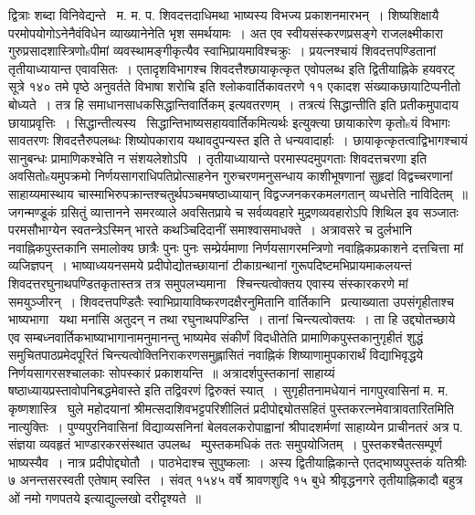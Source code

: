\documentclass[11pt, openany]{book}
\begin{document}
\noindent
द्वित्राः शब्दा विनिवेद्यन्ते \textendash\ म. म. प. शिवदत्तदाधिमथा भाष्यस्य विभज्य प्रकाशनमारभन्~। शिष्यशिक्षायै परमोपयोगोऽनेनैवंविधेन व्याख्यानेनेति भृश समर्थयामः~। अत एव स्वीयसंस्करणप्रसङ्गे राजलक्ष्मीकारा गुरुप्रसादशास्त्रिणोsपीमां व्यवस्थामङ्गीकृत्यैव स्वाभिप्रायमाविश्चक्रुः~। प्रयत्नश्चायं शिवदत्तपण्डितानां तृतीयाध्यायान्त एवावसितः~। एतादृशविभागश्च शिवदत्तैश्छायाकृत्कृत एवोपलब्ध इति द्वितीयाह्निके हयवरट् सूत्रे १४० तमे पृष्ठे {\qt अनुवर्तते विभाषा शरोचि} इति श्लोकवार्तिकावतरणे ११ एकादश संख्याकछायाटिप्पनीतो बोध्यते~। तत्र हि समाधानसाधकसिद्धान्तिवार्तिकम् इत्यवतरणम्~। तत्रत्यं {\qt सिद्धान्तीति} इति प्रतीकमुपादाय छायाप्रवृत्तिः~। {\qt सिद्धान्तीत्यस्य \textendash\ सिद्धान्तिभाष्यसहायवार्तिकमित्यर्थः} इत्युक्त्या छायाकारेण कृतोsयं विभागः सावतरणः शिवदत्तैरुपलब्धः शिष्योपकाराय यथावदुपन्यस्त इति ते धन्यवादार्हाः~। छायाकृत्कृतत्वाद्विभागश्चायं सानुबन्धः प्रामाणिकश्चेति न संशयलेशोऽपि~। तृतीयाध्यायान्ते परमास्पदमुपगताः शिवदत्तचरणा इति अवसितोsयमुपक्रमो निर्णयसागराधिपतिप्रोत्साहनेन गुरुचरणमनुसन्धाय काशीभूषणानां सुहृदां विद्वच्चरणानां साहाय्यमास्थाय चास्माभिरुपक्रान्तश्चतुर्थपञ्चमषष्ठाध्यायान् विद्वज्जनकरकमलगतान् व्यधत्तेति नाविदितम्~॥ जगन्मण्डूकं ग्रसितुं व्यात्तानने समरव्याले अवसितप्राये च सर्वव्यवहारे मुद्रणव्यवहारोऽपि शिथिल इव सञ्जातः परमसौभाग्येन स्वतन्त्रेऽस्मिन् भारते कथञ्चिदिदानीं समाश्वासमाधक्ते~। अत्रावसरे च दुर्लभानि नवाह्निकपुस्तकानि समालोक्य छात्रैः पुनः पुनः सम्प्रेर्यमाणा निर्णयसागरमन्त्रिणो नवाह्निकप्रकाशने दत्तचित्ता मां व्यजिज्ञपन्~। भाष्याध्ययनसमये प्रदीपोद्योतच्छायानां टीकाग्रन्थानां गुरूपदिष्टमभिप्रायमाकलयन्तं शिवदत्तरघुनाथपण्डितकृतास्तत्र तत्र समुपलभ्यमाना \textendash\ श्चिन्त्यत्वोक्तय एवास्य संस्कारकरणे मां समयुञ्जीरन्~। शिवदत्तपण्डितैः स्वाभिप्रायाविष्करणदक्षैरनुमितानि वार्तिकानि \textendash\ प्रत्याख्याता उपसंगृहीताश्च भाष्यभागा \textendash\ यथा मनांसि अतुदन् न तथा रघुनाथपण्डिन्ति~। तानां चिन्त्यत्वोक्तयः~। ता हि उद्द्योतच्छाये एव सम्बध्नवार्तिकभाष्याभागानामनुमानन्तु भाष्यमेव संकीर्णं विदधीतेति प्रामाणिकपुस्तकानुगृहीतं शुद्धं समुचितपाठप्रमेदपूरितं चिन्त्यत्वोक्तिनिराकरणसमुह्लासितं नवाह्निकं शिष्याणामुपकारार्थं विद्याभिवृद्धये निर्णयसागरसश्चालकाः सोपस्कारं प्रकाशयन्ति~॥ अत्रादर्शपुस्तकानां साहाय्यं षष्ठाध्यायप्रस्तावोपनिबद्धमेवास्ते इति तद्विवरणं द्विरुक्तं स्यात्~। सुगृहीतनामधेयानं नागपुरवासिनां म. म. कृष्णशास्त्रि \textendash\ घुले महोदयानां श्रीमत्सदाशिवभट्टपरिशीलितं प्रदीपोद्द्योतसहितं पुस्तकरत्नमेवात्रावतारितमिति नात्युक्तिः~। पुण्यपुरनिवासिनां विद्याव्यसनिनां बेलवलकरोपाह्वानां श्रीपादशर्मणां साहाय्येन प्राचीनतरं अत्र प. संज्ञया व्यवहृतं भाण्डारकरसंस्थात उपलब्ध \textendash\ म्पुस्तकमधिकं ततः समुपयोजितम्~। पुस्तकश्चैतत्सम्पूर्ण भाष्यस्यैव~। नात्र प्रदीपोद्द्योतौ~। पाठभेदाश्च सुपुष्कलाः~। अस्य द्वितीयाह्निकान्ते {\qt एतद्भाष्यपुस्तकं यतिश्रीः ७ अनन्तसरस्वती एतेषाम् स्वस्ति~। संवत् १५४५ वर्षे श्रावणशुदि १५ बुधे श्रीवृद्धनगरे तृतीयाह्निकादौ बहुत्र ओं नमो गणपतये} इत्याद्युल्लखो दरीदृश्यते~॥\\
\end{document}
